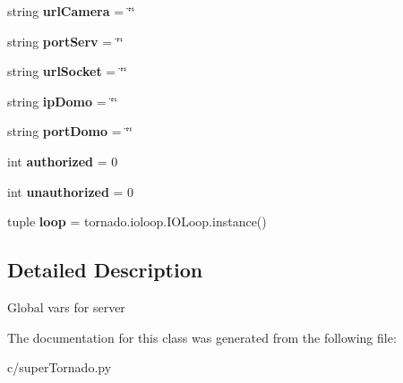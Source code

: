 \begin{DoxyCompactItemize}
\item 
\hypertarget{classsuper_tornado_1_1_global_vars_af9c579f7873a30bd5ee9d3547fea1ecd}{string {\bfseries url\-Camera} = \char`\"{}\char`\"{}}\label{classsuper_tornado_1_1_global_vars_af9c579f7873a30bd5ee9d3547fea1ecd}

\item 
\hypertarget{classsuper_tornado_1_1_global_vars_a46b35cd7e739aad2f78100e5c44be95a}{string {\bfseries port\-Serv} = \char`\"{}\char`\"{}}\label{classsuper_tornado_1_1_global_vars_a46b35cd7e739aad2f78100e5c44be95a}

\item 
\hypertarget{classsuper_tornado_1_1_global_vars_a198024d11aabe49f4cced6f8c92f2557}{string {\bfseries url\-Socket} = \char`\"{}\char`\"{}}\label{classsuper_tornado_1_1_global_vars_a198024d11aabe49f4cced6f8c92f2557}

\item 
\hypertarget{classsuper_tornado_1_1_global_vars_a5d938abea96eeb8ba2506a5630852151}{string {\bfseries ip\-Domo} = \char`\"{}\char`\"{}}\label{classsuper_tornado_1_1_global_vars_a5d938abea96eeb8ba2506a5630852151}

\item 
\hypertarget{classsuper_tornado_1_1_global_vars_af6421d020adaaef6fe34eda225be7ad8}{string {\bfseries port\-Domo} = \char`\"{}\char`\"{}}\label{classsuper_tornado_1_1_global_vars_af6421d020adaaef6fe34eda225be7ad8}

\item 
\hypertarget{classsuper_tornado_1_1_global_vars_a53190e11b952863f655e2a8637b4d9b0}{int {\bfseries authorized} = 0}\label{classsuper_tornado_1_1_global_vars_a53190e11b952863f655e2a8637b4d9b0}

\item 
\hypertarget{classsuper_tornado_1_1_global_vars_ace59d34b127bace56dd6db537a5134a1}{int {\bfseries unauthorized} = 0}\label{classsuper_tornado_1_1_global_vars_ace59d34b127bace56dd6db537a5134a1}

\item 
\hypertarget{classsuper_tornado_1_1_global_vars_a19bf135e50433c4c306b59ee9186346a}{tuple {\bfseries loop} = tornado.\-ioloop.\-I\-O\-Loop.\-instance()}\label{classsuper_tornado_1_1_global_vars_a19bf135e50433c4c306b59ee9186346a}

\end{DoxyCompactItemize}


\subsection{Detailed Description}
\begin{DoxyVerb}Global vars for server
\end{DoxyVerb}
 

The documentation for this class was generated from the following file\-:\begin{DoxyCompactItemize}
\item 
c/super\-Tornado.\-py\end{DoxyCompactItemize}
